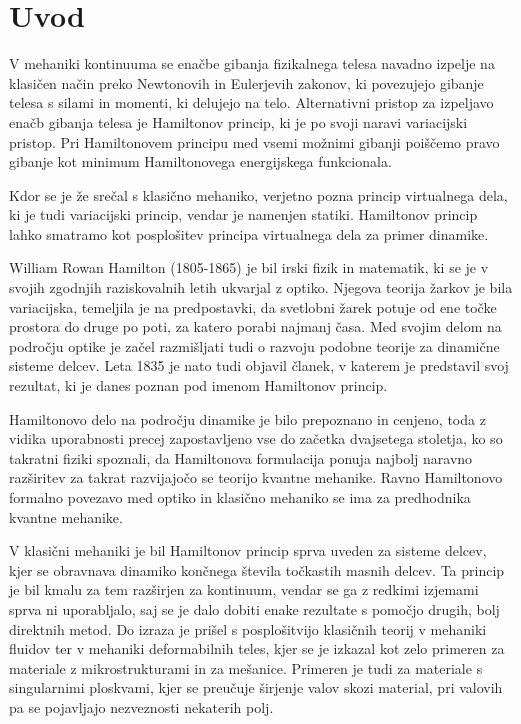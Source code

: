 \chapter{Uvod}


V mehaniki kontinuuma se enačbe gibanja fizikalnega telesa navadno izpelje
na klasičen način preko Newtonovih in Eulerjevih zakonov, ki povezujejo
gibanje telesa s silami in momenti, ki delujejo na telo. Alternativni pristop
za izpeljavo enačb gibanja telesa je Hamiltonov princip, ki je po svoji
naravi variacijski pristop. Pri Hamiltonovem principu med vsemi možnimi
gibanji poiščemo pravo gibanje kot minimum Hamiltonovega energijskega funkcionala.

Kdor se je že srečal s klasično mehaniko, verjetno pozna princip virtualnega dela,
ki je tudi variacijski princip, vendar je namenjen statiki. Hamiltonov
princip lahko smatramo kot posplošitev principa virtualnega dela za primer dinamike.

William Rowan Hamilton (1805-1865) je bil irski fizik in matematik, ki se je
v svojih zgodnjih raziskovalnih letih ukvarjal z optiko. Njegova teorija žarkov
je bila variacijska, temeljila je na predpostavki, da svetlobni žarek potuje
od ene točke prostora do druge po poti, za katero porabi najmanj časa. Med
svojim delom na področju optike je začel razmišljati tudi o razvoju podobne
teorije za dinamične sisteme delcev. Leta 1835 je nato tudi objavil članek, v katerem
je predstavil svoj rezultat, ki je danes poznan pod imenom Hamiltonov princip.

Hamiltonovo delo na področju dinamike je bilo prepoznano in cenjeno, toda
z vidika uporabnosti precej zapostavljeno vse do začetka dvajsetega stoletja,
ko so takratni fiziki spoznali, da Hamiltonova formulacija ponuja najbolj
naravno razširitev za takrat razvijajočo se teorijo kvantne mehanike.
Ravno Hamiltonovo formalno povezavo med optiko in klasično mehaniko se ima
za predhodnika kvantne mehanike.

V klasični mehaniki je bil Hamiltonov princip sprva uveden za sisteme delcev,
kjer se obravnava dinamiko končnega števila točkastih masnih delcev.
Ta princip je bil kmalu za tem razširjen za kontinuum, vendar se ga
z redkimi izjemami sprva ni uporabljalo, saj se je dalo dobiti enake rezultate
s pomočjo drugih, bolj direktnih metod. Do izraza je prišel s posplošitvijo
klasičnih teorij v mehaniki fluidov ter v mehaniki deformabilnih teles,
kjer se je izkazal kot zelo primeren za materiale z mikrostrukturami in
za mešanice. Primeren je tudi za materiale s singularnimi ploskvami,
kjer se preučuje širjenje valov skozi material, pri valovih pa se pojavljajo
nezveznosti nekaterih polj.

